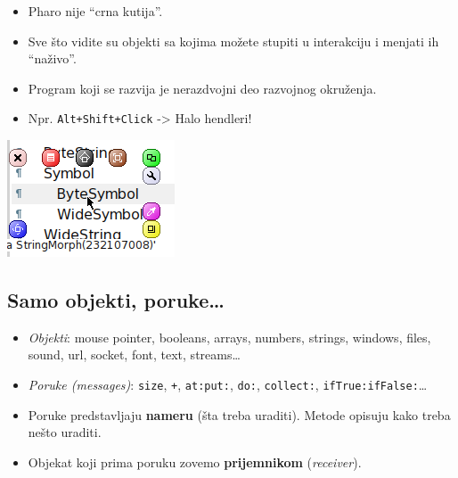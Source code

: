 \documentclass[presentation]{beamer}
\begin{document}
\begin{itemize}
\item Pharo nije ``crna kutija''.
\item Sve što vidite su objekti sa kojima možete stupiti u interakciju i menjati ih
``naživo''.
\item Program koji se razvija je nerazdvojni deo razvojnog okruženja.
\item Npr. \texttt{Alt+Shift+Click} -> Halo hendleri!
\end{itemize}

\begin{center}
\includegraphics[width=.9\linewidth]{./slike/halo.png}
\end{center}

\subsection{Samo objekti, poruke\ldots{}}
\label{sec:orgbfeb4ad}

\begin{itemize}
\item \emph{Objekti}: mouse pointer, booleans, arrays, numbers, strings, windows, files,
sound, url, socket, font, text, streams\ldots{}
\item \emph{Poruke (messages)}: \texttt{size}, \texttt{+}, \texttt{at:put:}, \texttt{do:}, \texttt{collect:},
\texttt{ifTrue:ifFalse:}\ldots{}
\item Poruke predstavljaju \textbf{\textbf{nameru}} (šta treba uraditi). Metode opisuju kako treba
nešto uraditi.
\item Objekat koji prima poruku zovemo \textbf{\textbf{prijemnikom}} (\emph{receiver}).
\end{itemize}
\end{document}
